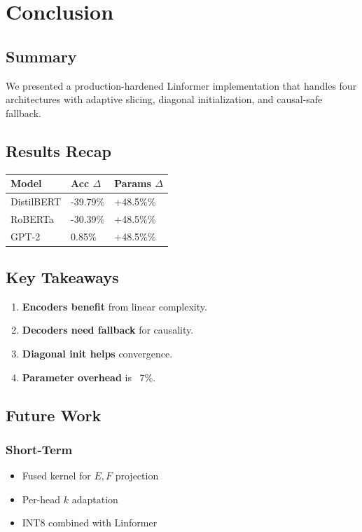 \section{Conclusion}

\subsection{Summary}

We presented a production-hardened Linformer implementation that handles 
four architectures with adaptive slicing, diagonal initialization, and 
causal-safe fallback.

\subsection{Results Recap}

\begin{table}[H]
\centering
\small
\begin{tabular}{lll}
\toprule
\textbf{Model} & \textbf{Acc $\Delta$} & \textbf{Params $\Delta$} \\
\midrule
DistilBERT & -39.79\% & +48.5\%\% \\
RoBERTa & -30.39\% & +48.5\%\% \\
GPT-2 & 0.85\% & +48.5\%\% \\
\bottomrule
\end{tabular}
\end{table}

\subsection{Key Takeaways}

\begin{enumerate}
\item \textbf{Encoders benefit} from linear complexity.
\item \textbf{Decoders need fallback} for causality.
\item \textbf{Diagonal init helps} convergence.
\item \textbf{Parameter overhead} is ~7\%.

\end{enumerate}
\subsection{Future Work}

\subsubsection{Short-Term}
\begin{itemize}
\item Fused kernel for $E, F$ projection
\item Per-head $k$ adaptation
\item INT8 combined with Linformer

\end{itemize}
